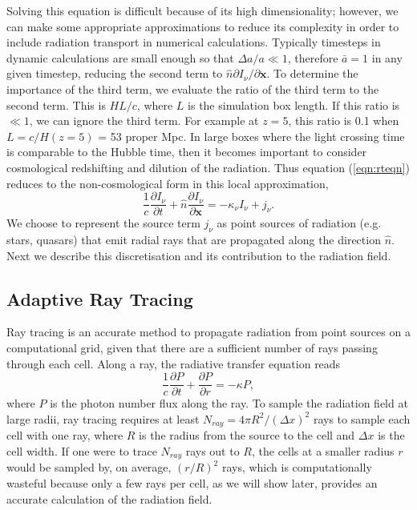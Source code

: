 \documentclass[useAMS,usenatbib]{mn2e}
\begin{document}
Solving this equation is difficult because of its high dimensionality;
however, we can make some appropriate approximations to reduce its
complexity in order to include radiation transport in numerical
calculations.  Typically timesteps in dynamic calculations are small
enough so that $\Delta a/a \ll 1$, therefore $\bar{a} = 1$ in any
given timestep, reducing the second term to $\hat{n} \partial
I_\nu/\partial \mathbf{x}$.  To determine the importance of the third
term, we evaluate the ratio of the third term to the second term.
This is $HL/c$, where $L$ is the simulation box length.  If this ratio
is $\ll 1$, we can ignore the third term.  For example at $z=5$, this
ratio is 0.1 when $L = c/H(z=5)$ = 53 proper Mpc.  In large boxes
where the light crossing time is comparable to the Hubble time, then
it becomes important to consider cosmological redshifting and dilution
of the radiation.  Thus equation (\ref{eqn:rteqn}) reduces to the
non-cosmological form in this local approximation,
%
\begin{equation}
  \frac{1}{c} \frac{\partial I_\nu}{\partial t} + 
  \hat{n} \frac{\partial I_\nu}{\partial \mathbf{x}} =
  -\kappa_\nu I_\nu + j_\nu .
\end{equation}
%
We choose to represent the source term $j_\nu$ as point sources of
radiation (e.g. stars, quasars) that emit radial rays that are
propagated along the direction $\hat{n}$.  Next we describe this
discretisation and its contribution to the radiation field.



\subsection{Adaptive Ray Tracing}
\label{sec:ART}

Ray tracing is an accurate method to propagate radiation from point
sources on a computational grid, given that there are a sufficient
number of rays passing through each cell.  Along a ray, the radiative
transfer equation reads
%
\begin{equation}
\label{eqn:rtray}
\frac{1}{c} \frac{\partial P}{\partial t} + \frac{\partial P}{\partial
  r} = -\kappa P,
\end{equation}
%
where $P$ is the photon number flux along the ray.  To sample the
radiation field at large radii, ray tracing requires at least $N_{ray}
= 4\pi R^2 / (\Delta x)^2$ rays to sample each cell with one ray,
where $R$ is the radius from the source to the cell and $\Delta x$ is
the cell width.  If one were to trace $N_{ray}$ rays out to $R$, the
cells at a smaller radius $r$ would be sampled by, on average,
$(r/R)^2$ rays, which is computationally wasteful because only a few
rays per cell, as we will show later, provides an accurate calculation
of the radiation field.
\end{document}

